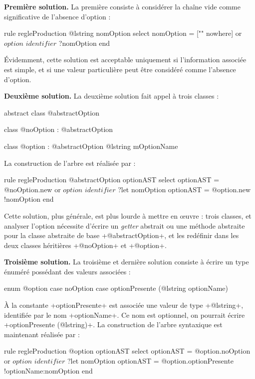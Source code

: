 \textbf{Première solution.} La première consiste à considérer la chaîne vide comme significative de l'absence d'option :
\begin{galgas3}
rule regleProduction {
  @lstring nomOption
  select
    nomOption = ["" nowhere]
  or
    $option$
    $identifier$ ?nomOption
  end
}
\end{galgas3}

Évidemment, cette solution est acceptable uniquement si l'information associée est simple, et si une valeur particulière peut être considéré comme l'absence d'option.

\textbf{Deuxième solution.} La deuxième solution fait appel à trois classes :
\begin{galgas3}
abstract class @abstractOption {}

class @noOption : @abstractOption {}

class @option : @abstractOption { @lstring mOptionName }
\end{galgas3}

La construction de l'arbre est réalisée par :
\begin{galgas3}
rule regleProduction {
  @abstractOption optionAST
  select
    optionAST = @noOption.new
  or
    $option$
    $identifier$ ?let nomOption
    optionAST = @option.new {!nomOption}
  end
}
\end{galgas3}

Cette solution, plus générale, est plus lourde à mettre en œuvre : trois classes, et analyser l'option nécessite d'écrire un \emph{getter} abstrait ou une méthode abstraite pour la classe abstraite de base \ggst+@abstractOption+, et les redéfinir dans les deux classes héritières \ggst+@noOption+ et \ggst+@option+.

\textbf{Troisième solution.} La troisième et dernière solution consiste à écrire un type énuméré possédant des valeurs associées :

\begin{galgas3}
enum @option {
  case noOption
  case optionPresente (@lstring optionName)
}
\end{galgas3}

À la constante \ggst+optionPresente+ est associée une valeur de type \ggst+@lstring+, identifiée par le nom \ggst+optionName+. Ce nom est optionnel, on pourrait écrire \ggst+optionPresente (@lstring)+. La construction de l'arbre syntaxique est maintenant réalisée par :
\begin{galgas3}
rule regleProduction {
  @option optionAST
  select
    optionAST = @option.noOption
  or
    $option$
    $identifier$ ?let nomOption
    optionAST = @option.optionPresente {!optionName:nomOption}
  end
}
\end{galgas3}

